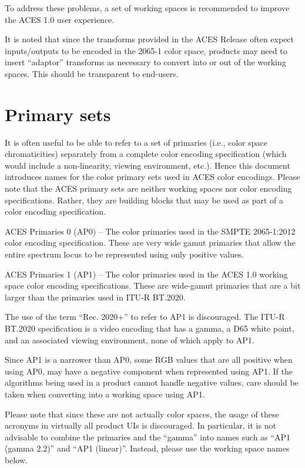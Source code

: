 To address these problems, a set of working spaces is recommended to improve the ACES 1.0 user experience.

It is noted that since the transforms provided in the ACES Release often expect inputs/outputs to be encoded in the 2065-1 color space, products may need to insert ``adaptor'' transforms as necessary to convert into or out of the working spaces. This should be transparent to end-users.

\section{Primary sets}
It is often useful to be able to refer to a set of primaries (i.e., color space chromaticities) separately from a complete color encoding specification (which would include a non-linearity, viewing environment, etc.). Hence this document introduces names for the color primary sets used in ACES color encodings. Please note that the ACES primary sets are neither working spaces nor color encoding specifications. Rather, they are building blocks that may be used as part of a color encoding specification.

ACES Primaries 0 (AP0) -- The color primaries used in the SMPTE 2065-1:2012 color encoding specification. These are very wide gamut primaries that allow the entire spectrum locus to be represented using only positive values.

ACES Primaries 1 (AP1) -- The color primaries used in the ACES 1.0 working space color encoding specifications. These are wide-gamut primaries that are a bit larger than the primaries used in ITU-R BT.2020.

The use of the term ``Rec. 2020+'' to refer to AP1 is discouraged. The ITU-R BT.2020 specification is a video encoding that has a gamma, a D65 white point, and an associated viewing environment, none of which apply to AP1.

Since AP1 is a narrower than AP0, some RGB values that are all positive when using AP0, may have a negative component when represented using AP1. If the algorithms being used in a product cannot handle negative values, care should be taken when converting into a working space using AP1.

Please note that since these are not actually color spaces, the usage of these acronyms in virtually all product UIs is discouraged. In particular, it is not advisable to combine the primaries and the ``gamma'' into names such as ``AP1 (gamma 2.2)'' and ``AP1 (linear)''. Instead, please use the working space names below.

